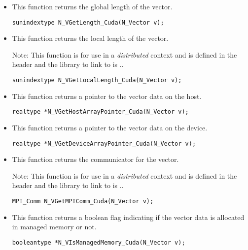 \begin{itemize}

\item {}

 This function returns the global length of the vector.

 \verb|sunindextype N_VGetLength_Cuda(N_Vector v);|


\item {}

 This function returns the local length of the vector.
    
 Note: This function is for use in a \textit{distributed} context and
 is defined in the header  and the library
 to link to is ..

 \verb|sunindextype N_VGetLocalLength_Cuda(N_Vector v);|


\item {}

 This function returns a pointer to the vector data on the host.

 \verb|realtype *N_VGetHostArrayPointer_Cuda(N_Vector v);|



\item {}

 This function returns a pointer to the vector data on the device.

 \verb|realtype *N_VGetDeviceArrayPointer_Cuda(N_Vector v);|


\item {}

 This function returns the {\mpi} communicator for the vector.
 
    
 Note: This function is for use in a \textit{distributed} context
 and is defined in the header  and the
 library to link to is ..

 \verb|MPI_Comm N_VGetMPIComm_Cuda(N_Vector v);|


\item {}

 This function returns a boolean flag indicating if the vector
 data is allocated in managed memory or not.

 \verb|booleantype *N_VIsManagedMemory_Cuda(N_Vector v);|
\end{itemize}



